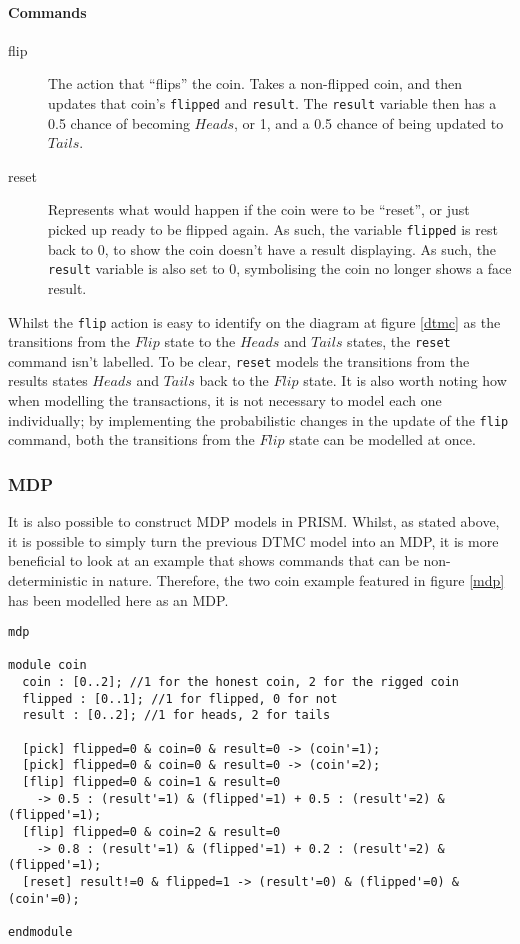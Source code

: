 \documentclass{l4proj}
\begin{document}
\paragraph{Commands}
\begin{description}
\item[flip] The action that ``flips'' the coin. Takes a non-flipped coin, and then updates that coin's {\tt flipped} and {\tt result}. The {\tt result} variable then has a 0.5 chance of becoming $Heads$, or 1, and a 0.5 chance of being updated to $Tails$.
\item[reset] Represents what would happen if the coin were to be ``reset'', or just picked up ready to be flipped again. As such, the variable {\tt flipped} is rest back to 0, to show the coin doesn't have a result displaying. As such, the {\tt result} variable is also set to 0, symbolising the coin no longer shows a face result.
\end{description}

Whilst the {\tt flip} action is easy to identify on the diagram at figure \ref{dtmc} as the transitions from the $Flip$ state to the $Heads$ and $Tails$ states, the {\tt reset} command isn't labelled. To be clear, {\tt reset} models the transitions from the results states $Heads$ and $Tails$ back to the $Flip$ state. It is also worth noting how when modelling the transactions, it is not necessary to model each one individually; by implementing the probabilistic changes in the update of the {\tt flip} command, both the transitions from the $Flip$ state can be modelled at once. 

\subsubsection{MDP}

It is also possible to construct MDP models in PRISM. Whilst, as stated above, it is possible to simply turn the previous DTMC model into an MDP, it is more beneficial to look at an example that shows commands that can be non-deterministic in nature. Therefore, the two coin example featured in figure \ref{mdp} has been modelled here as an MDP.

\begin{verbatim}
mdp

module coin
  coin : [0..2]; //1 for the honest coin, 2 for the rigged coin
  flipped : [0..1]; //1 for flipped, 0 for not
  result : [0..2]; //1 for heads, 2 for tails

  [pick] flipped=0 & coin=0 & result=0 -> (coin'=1);
  [pick] flipped=0 & coin=0 & result=0 -> (coin'=2);
  [flip] flipped=0 & coin=1 & result=0 
    -> 0.5 : (result'=1) & (flipped'=1) + 0.5 : (result'=2) & (flipped'=1);
  [flip] flipped=0 & coin=2 & result=0 
    -> 0.8 : (result'=1) & (flipped'=1) + 0.2 : (result'=2) & (flipped'=1);
  [reset] result!=0 & flipped=1 -> (result'=0) & (flipped'=0) & (coin'=0);
	
endmodule
\end{verbatim}
\end{document}
